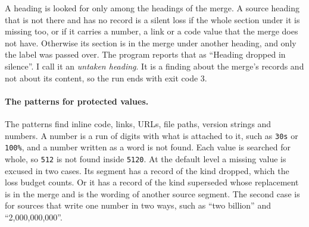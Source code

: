 A heading is looked for only among the headings of the merge. A source heading that is not there and has no record is a silent loss if the whole section under it is missing too, or if it carries a number, a link or a code value that the merge does not have. Otherwise its section is in the merge under another heading, and only the label was passed over. The program reports that as ``Heading dropped in silence''. I call it an \emph{untaken heading}. It is a finding about the merge's records and not about its content, so the run ends with exit code 3.

\paragraph{The patterns for protected values.} The patterns find inline code, links, URLs, file paths, version strings and numbers. A number is a run of digits with what is attached to it, such as \texttt{30s} or \texttt{100\%}, and a number written as a word is not found. Each value is searched for whole, so \texttt{512} is not found inside \texttt{5120}. At the default level a missing value is excused in two cases. Its segment has a record of the kind dropped, which the loss budget counts. Or it has a record of the kind superseded whose replacement is in the merge and is the wording of another source segment. The second case is for sources that write one number in two ways, such as ``two billion'' and ``2,000,000,000''.
